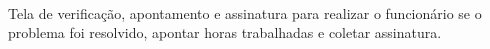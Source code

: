 \begin{figure}[htb]
	\centering
	\mbox{%
		\qquad
	}
	
\end{figure}
\newpage
Tela de verificação, apontamento e assinatura para realizar o funcionário se o problema foi resolvido, apontar horas trabalhadas e coletar assinatura.
